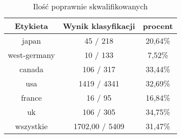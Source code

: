 \documentclass{classrep}
\begin{document}
\begin{table}[h]
\centering
\begin{tabular}{|c|c|c|}
\hline
Etykieta & Wynik klasyfikacji & procent\\
\hline
japan & 45 / 218 & 20,64\%\\
\hline
west-germany & 10 / 133 & 7,52\%\\
\hline
canada & 106 / 317 & 33,44\%\\
\hline
usa & 1419 / 4341 & 32,69\%\\
\hline
france & 16 / 95 & 16,84\%\\
\hline
uk & 106 / 305 & 34,75\%\\
\hline
wszystkie & 1702,00 / 5409 & 31,47\%\\
\hline
\end{tabular}
\caption{Ilość poprawnie skwalifikowanych}\end{table}
\end{document}
